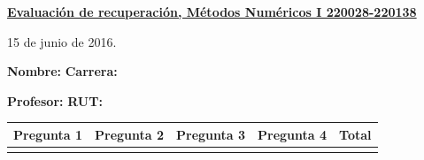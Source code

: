 \documentclass[11pt]{article}
\begin{document}
\hspace*{-1,5cm}

\vspace*{0.5cm} \centerline {\bf\underline{Evaluaci\'on de recuperaci\'on, M\'etodos Num\'ericos I 220028-220138 }}
\centerline{\textrm{15 de junio de 2016.}}  \vspace{0.2cm}


\textbf{Nombre:} \hspace{0.5\textwidth}\textbf{Carrera:}

\vspace{0.1cm}
\textbf{Profesor:}\hspace{0.5\textwidth} \textbf{ RUT:}

\begin{center}
 \begin{tabular}{||p{2cm}|p{2cm}|p{2cm}|p{2cm}||p{2cm}||}
 \hline
 Pregunta 1 &  Pregunta 2 &     Pregunta 3  & Pregunta 4 &Total\\
 \hline

  \vspace{1.5cm} & & & & \\
 \hline
 \end{tabular}
 \end{center}
\end{document}
